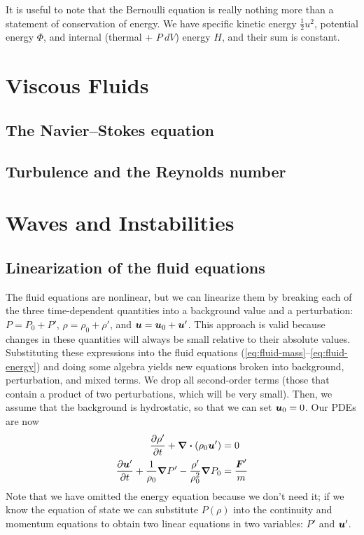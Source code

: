 It is useful to note that the Bernoulli equation is really nothing more than a statement of conservation of energy. We have specific kinetic energy $\tfrac{1}{2} u^2$, potential energy $\Phi$, and internal (thermal + $P \: dV$) energy $H$, and their sum is constant.


\section{Viscous Fluids}
\subsection{The Navier--Stokes equation}

\subsection{Turbulence and the Reynolds number}


\section{Waves and Instabilities}
\subsection{Linearization of the fluid equations}
The fluid equations are nonlinear, but we can linearize them by breaking each of the three time-dependent quantities into a background value and a perturbation: $P = P_0 + P'$, $\rho = \rho_0 + \rho'$, and $\vb*{u} = \vb*{u}_0 + \vb*{u}'$. This approach is valid because changes in these quantities will always be small relative to their absolute values. Substituting these expressions into the fluid equations (\ref{eq:fluid-mass}--\ref{eq:fluid-energy}) and doing some algebra yields new equations broken into background, perturbation, and mixed terms. We drop all second-order terms (those that contain a product of two perturbations, which will be very small). Then, we assume that the background is hydrostatic, so that we can set $\vb*{u}_0 = 0$. Our PDEs are now
\begin{align}
    \pdv{\rho'}{t} + \div{(\rho_0 \vb*{u}')} &= 0 \label{eq:linear-continuity} \\
    \pdv{\vb*{u}'}{t} + \frac{1}{\rho_0} \grad{P'} - \frac{\rho'}{\rho_0^2} \grad{P_0} &= \frac{\vb*{F}'}{m} \label{eq:linear-momentum} %
\end{align}
Note that we have omitted the energy equation because we don't need it; if we know the equation of state we can substitute $P(\rho)$ into the continuity and momentum equations to obtain two linear equations in two variables: $P'$ and $\vb*{u}'$.

